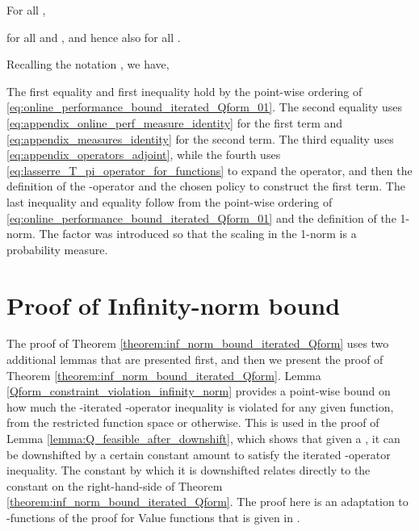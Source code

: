 \documentclass[journal]{IEEEtran}
\begin{document}
\vspace{0.2cm}
\begin{IEEEproof}
		
	For all ,
	
	for all  and , and hence also for all .
	
	
	Recalling the notation , we have,
	
	
	The first equality and first inequality hold by the point-wise ordering of \eqref{eq:online_performance_bound_iterated_Qform_01}. The second equality uses \eqref{eq:appendix_online_perf_measure_identity} for the first term and \eqref{eq:appendix_measures_identity} for the second term. The third equality uses \eqref{eq:appendix_operators_adjoint}, while the fourth uses \eqref{eq:lasserre_T_pi_operator_for_functions} to expand the  operator, and then the definition of the -operator and the chosen policy to construct the first term. The last inequality and equality follow from the point-wise ordering of \eqref{eq:online_performance_bound_iterated_Qform_01} and the definition of the 1-norm. The factor  was introduced so that the scaling in the 1-norm is a probability measure.
\end{IEEEproof}

\vspace{0.2cm}

 









\section{Proof of Infinity-norm bound} \label{app:proof_bound_inf_norm_Qform}

The proof of Theorem \ref{theorem:inf_norm_bound_iterated_Qform} uses two additional lemmas that are presented first, and then we present the proof of Theorem \ref{theorem:inf_norm_bound_iterated_Qform}.
Lemma \ref{Qform_constraint_violation_infinity_norm} provides a point-wise bound on how much the -iterated -operator inequality is violated for any given  function, from the restricted function space or otherwise. This is used in the proof of Lemma \ref{lemma:Q_feasible_after_downshift}, which shows that given a , it can be downshifted by a certain constant amount to satisfy the iterated -operator inequality. The constant by which it is downshifted relates directly to the constant on the right-hand-side of Theorem \ref{theorem:inf_norm_bound_iterated_Qform}.
The proof here is an adaptation to -functions of the proof for Value functions that is given in \cite[\S 4.3]{boyd_iteratedBellman}.
\end{document}
